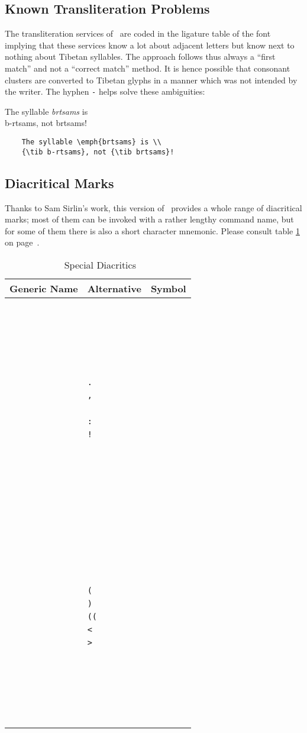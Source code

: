 \documentclass[a4paper,11pt]{article}
\newcommand\exa{\nopagebreak \begin{flushleft}\smallskip \nopagebreak
                \begin{minipage}[t]{6cm}\sloppy}
\newcommand\exb{\end{minipage}\kern 1cm\begin{minipage}[t]{8cm}\sloppy }
\newcommand\exc{\end{minipage}\kern -3cm \smallskip\end{flushleft}}
\begin{document}
\subsection{Known Transliteration Problems\label{TransliterationProblems}}

The transliteration services of \TibTeX\ are coded in the ligature
table of the font implying that these services know a lot about adjacent
letters but know next to nothing about Tibetan syllables. The approach
follows thus always a ``first match'' and not a ``correct match'' method.
It is hence possible that consonant clusters are converted to Tibetan
glyphs in a manner which was not intended by the writer. The hyphen
\verb|-| helps solve these ambiguities:

\exa
	The syllable \emph{brtsams} is \\
	{\tib b-rtsams}, not {\tib brtsams}!
\exb
	\begin{verbatim}
	The syllable \emph{brtsams} is \\
	{\tib b-rtsams}, not {\tib brtsams}!
	\end{verbatim}
\exc


\subsection{Diacritical Marks}

Thanks to Sam Sirlin's work, this version of \TibTeX\ provides a
whole range of diacritical marks; most of them can be invoked with a 
rather lengthy command name, but for some of them there is also a
short character mnemonic. Please consult table \ref{SpecialDiacritics} on
page~\pageref{SpecialDiacritics}.

\newcommand{\TC}[2]{%
	\tt\string#1	& \tt\string#2 & {\tib#1} \\
	}

\begin{table}
\begin{center}
\begin{tabular}{llc}
	Generic Name & Alternative & Symbol \\\hline
\TC{\tibvarfive			}{}
\TC{\tibvarsix			}{}
\TC{\tibvarseven		}{}
\TC{\tibvareight		}{}
\TC{\tibvarnine			}{}
\TC{\tibempty			}{}
\TC{\tibShad			}{.}
\TC{\tibTsheg			}{,}
\TC{\tibSwasti			}{\swasti}
\TC{\tibVisarga			}{:}
\TC{\tibTshegshad		}{!}
\TC{\tibAlttshegshad		}{}
\TC{\tibNyistshegshad		}{}
\TC{\tibChemgoshad		}{}
\TC{\tibSbrulshad		}{}
\TC{\tibRgyagramshad		}{}
\TC{\tibVarchemgoshad		}{}
\TC{\tibRjessungaro		}{}
\TC{\tibSnaldan			}{}
\TC{\tibRnambcad		}{}
\TC{\tibGtertsheg		}{}
\TC{\tibRinchenspungsshad	}{}
\TC{\tibTopiniyigmgomdunma	}{(}
\TC{\tibFinalyigmgomdunma	}{)}
\TC{\tibIniyigmgomdunma		}{((}
\TC{\tibAngkhyanggyon		}{<}
\TC{\tibAngkhyanggyas		}{>}
\TC{\tibHalanta			}{}
\TC{\tibLcirtags		}{}
\TC{\tibNyizlanaada		}{}
\TC{\tibHalf			}{}
\TC{\tibGteryigmgotr		}{}
\TC{\tibPaluta			}{}
\end{tabular}
\end{center}
\caption{\TibTeX\ Special Diacritics\label{SpecialDiacritics}}
\end{table}
\end{document}

